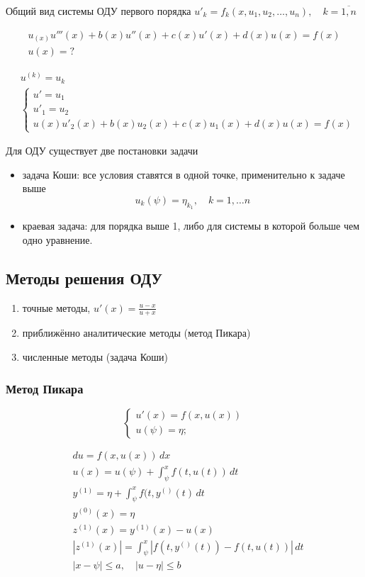 Общий вид системы ОДУ первого порядка $u'_k = f_k(x, u_1, u_2, \dots, u_n), \quad k = \overline{1, n}$

\begin{align*}
	u_(x) u'''(x) + b(x) u''(x) + c(x) u'(x) + d(x) u(x) = f(x) 
	\\
	u(x) = ?
\end{align*}

\begin{align*}
	&u^{(k)} = u_k
	\\
	&\begin{cases*}
		u' = u_1\\
		u'_1 = u_2\\
		u(x) u'_2(x) + b(x) u_2(x) + c(x) u_1(x) + d(x) u(x) = f(x)
	\end{cases*}
\end{align*}

Для ОДУ существует две постановки задачи
\begin{itemize}
	\item задача Коши: все условия ставятся в одной точке, применительно к задаче выше
	\[
		u_k(\psi) = \eta_{k_1}, \quad k = 1, \dots n
	\]
	\item краевая задача: для порядка выше 1, либо для системы в которой больше чем одно уравнение.
\end{itemize}

\subsection{Методы решения ОДУ}

\begin{enumerate}
	\item точные методы, $\displaystyle u'(x) = \frac{u - x}{u + x}$
	\item приближённо аналитические методы (метод Пикара)
	\item численные методы (задача Коши)
\end{enumerate}

\subsubsection{Метод Пикара}

\[
	\begin{cases*}
		u'(x) = f(x, u(x))\\
		u(\psi) = \eta;
	\end{cases*}
\]

\begin{align*}
	&du = f(x, u(x))\, dx
	\\
	&u(x) = u(\psi) + \int_{\psi}^{x} f(t, u(t))\, dt
	\\
	&y^{(1)} = \eta + \int_{\psi}^{x} f(t, y^{()}(t)\, dt
	\\
	&y^{(0)}(x) = \eta
	\\
	&z^{(1)}(x) = y^{(1)}(x) - u(x)
	\\
	&|z^{(1)}(x)| = \int_{\psi}^{x} |f(t, y^{()}(t)) - f(t, u(t)) |\, dt
	\\
	&|x - \psi | \leq a, \quad |u - \eta| \leq b
\end{align*}

